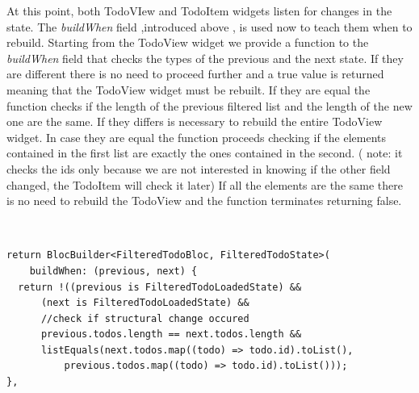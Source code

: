 At this point, both TodoVIew and TodoItem widgets listen for changes in the state. The \textit{buildWhen} field ,introduced above , is used now to teach them when to rebuild. Starting from the TodoView widget we provide a function to the \textit{buildWhen} field that checks the types of the previous and the next state. If they are different there is no need to proceed further and a true value is returned meaning that the TodoView widget must be rebuilt. If they are equal the function checks if the length of the previous filtered list and the length of the new one are the same. If they differs is necessary to rebuild the entire TodoView widget. In case they are equal the function proceeds checking if the elements contained in the first list are exactly the ones contained in the second. ( note: it checks the ids only because we are not interested in knowing if the other field changed, the TodoItem will check it later) If all the elements are the same there is no need to rebuild the TodoView and the function terminates returning false.
\begin{code}
\mbox{}\\
 \mbox{}
\label{code:2.14}
\begin{verbatim}
return BlocBuilder<FilteredTodoBloc, FilteredTodoState>(
    buildWhen: (previous, next) {
  return !((previous is FilteredTodoLoadedState) &&
      (next is FilteredTodoLoadedState) &&
      //check if structural change occured
      previous.todos.length == next.todos.length &&
      listEquals(next.todos.map((todo) => todo.id).toList(),
          previous.todos.map((todo) => todo.id).toList()));
},
\end{verbatim}
\mbox{}
\end{code}

